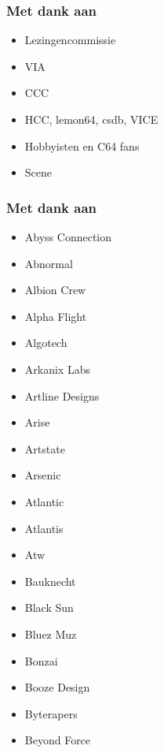 
\begin{frame}
\frametitle{Met dank aan}

\begin{itemize}
\item Lezingencommissie
\item VIA
\item CCC
\item HCC, lemon64, csdb, VICE
\item Hobbyisten en C64 fans
\item Scene
\end{itemize}

\end{frame}


\begin{frame}
\frametitle{Met dank aan}

\begin{multicols}{3}
\begin{itemize}
\item Abyss Connection
\item Abnormal
\item Albion Crew
\item Alpha Flight
\item Algotech
\item Arkanix Labs
\item Artline Designs
\item Arise
\item Artstate
\item Arsenic
\item Atlantic
\item Atlantis
\item Atw
\item Bauknecht
\item Black Sun
\item Bluez Muz
\item Bonzai
\item Booze Design
\item Byterapers
\item Beyond Force
\end{itemize}
\end{multicols}

\end{frame}


